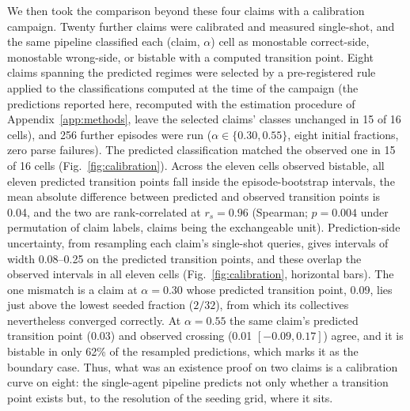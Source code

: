 \documentclass{ieeeaccess}
\begin{document}
We then took the comparison beyond these four claims with a calibration
campaign. Twenty further claims were calibrated and measured single-shot,
and the same pipeline classified each (claim, $\alpha$) cell as monostable
correct-side, monostable wrong-side, or bistable with a computed transition
point. Eight claims spanning the predicted regimes were selected by a
pre-registered rule applied to the classifications computed at the time of
the campaign (the predictions reported here, recomputed with the estimation procedure of Appendix~\ref{app:methods}, leave the selected claims' classes unchanged in 15 of
16 cells), and 256 further episodes were run ($\alpha \in \{0.30, 0.55\}$,
eight initial fractions, zero parse failures). The predicted classification
matched the observed one in 15 of 16 cells (Fig.~\ref{fig:calibration}).
Across the eleven cells observed bistable, all eleven predicted transition
points fall inside the episode-bootstrap intervals, the mean absolute
difference between predicted and observed transition points is 0.04, and
the two are rank-correlated at $r_s = 0.96$ (Spearman; $p = 0.004$ under
permutation of claim labels, claims being the exchangeable unit).
Prediction-side uncertainty, from resampling each claim's single-shot
queries, gives intervals of width 0.08--0.25 on the predicted transition
points, and these overlap the observed intervals in all eleven cells
(Fig.~\ref{fig:calibration}, horizontal bars). The one mismatch is a claim
at $\alpha = 0.30$ whose predicted transition point, 0.09, lies just above
the lowest seeded fraction ($2/32$), from which its collectives
nevertheless converged correctly. At $\alpha = 0.55$ the same claim's
predicted transition point (0.03) and observed crossing (0.01
$[-0.09, 0.17]$) agree, and it is bistable in only 62\% of the resampled
predictions, which marks it as the boundary case. Thus, what was an
existence proof on two claims is a calibration curve on eight: the
single-agent pipeline predicts not only whether a transition point exists
but, to the resolution of the seeding grid, where it sits.
\end{document}
